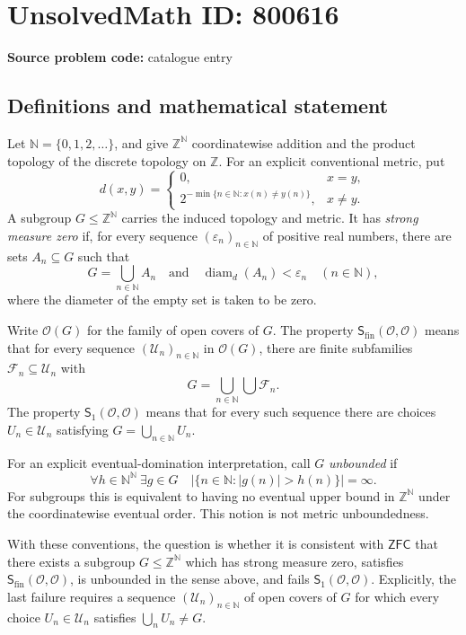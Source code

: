 \documentclass[11pt]{article}
\newcommand{\N}{\mathbb{N}}
\newcommand{\Z}{\mathbb{Z}}
\begin{document}
\section*{UnsolvedMath ID: 800616}
\textbf{Source problem code:} catalogue entry
\subsection{Definitions and mathematical statement}
Let \(\N=\{0,1,2,\ldots\}\), and give \(\Z^{\N}\) coordinatewise addition and the product topology of the discrete topology on \(\Z\). For an explicit conventional metric, put
\[
d(x,y)=\begin{cases}0,&x=y,\\2^{-\min\{n\in\N:x(n)\ne y(n)\}},&x\ne y.\end{cases}
\]
A subgroup \(G\le\Z^{\N}\) carries the induced topology and metric. It has \emph{strong measure zero} if, for every sequence \((\varepsilon_n)_{n\in\N}\) of positive real numbers, there are sets \(A_n\subseteq G\) such that
\[
G=\bigcup_{n\in\N}A_n\quad\text{and}\quad \operatorname{diam}_d(A_n)<\varepsilon_n\quad(n\in\N),
\]
where the diameter of the empty set is taken to be zero.

Write \(\mathcal O(G)\) for the family of open covers of \(G\). The property \(\mathsf S_{\mathrm{fin}}(\mathcal O,\mathcal O)\) means that for every sequence \((\mathcal U_n)_{n\in\N}\) in \(\mathcal O(G)\), there are finite subfamilies \(\mathcal F_n\subseteq\mathcal U_n\) with
\[
G=\bigcup_{n\in\N}\bigcup\mathcal F_n.
\]
The property \(\mathsf S_1(\mathcal O,\mathcal O)\) means that for every such sequence there are choices \(U_n\in\mathcal U_n\) satisfying \(G=\bigcup_{n\in\N}U_n\).

For an explicit eventual-domination interpretation, call \(G\) \emph{unbounded} if
\[
\forall h\in\N^{\N}\ \exists g\in G\quad
\bigl|\{n\in\N:|g(n)|>h(n)\}\bigr|=\infty.
\]
For subgroups this is equivalent to having no eventual upper bound in \(\Z^{\N}\) under the coordinatewise eventual order. This notion is not metric unboundedness.

With these conventions, the question is whether it is consistent with \(\mathsf{ZFC}\) that there exists a subgroup \(G\le\Z^{\N}\) which has strong measure zero, satisfies \(\mathsf S_{\mathrm{fin}}(\mathcal O,\mathcal O)\), is unbounded in the sense above, and fails \(\mathsf S_1(\mathcal O,\mathcal O)\). Explicitly, the last failure requires a sequence \((\mathcal U_n)_{n\in\N}\) of open covers of \(G\) for which every choice \(U_n\in\mathcal U_n\) satisfies \(\bigcup_n U_n\ne G\).
\end{document}

